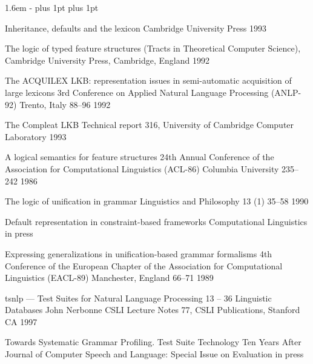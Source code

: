 \documentclass[12pt]{report}
\begin{document}
\begin{list}{}
   {\leftmargin 1.6em
    \itemindent -\leftmargin
    \itemsep 0pt plus 1pt
    \parsep 0pt plus 1pt}

{Inheritance, defaults and the lexicon}
{Cambridge University Press}
{1993}

{The logic of typed feature structures}
{(Tracts in Theoretical Computer Science), Cambridge University Press,
  Cambridge, England} 
{1992}


{The ACQUILEX LKB: representation issues in semi-automatic
acquisition of large lexicons}
{3rd Conference on Applied Natural Language Processing (ANLP-92)}
{Trento, Italy}
{88--96}
{1992}

{The Compleat LKB}
{Technical report 316,
University of Cambridge Computer Laboratory}
{1993}


{A logical semantics for feature structures}
{24th Annual Conference of the Association for Computational
Linguistics (ACL-86)}
{Columbia University}
{235--242}
{1986}

{The logic of unification in grammar}
{Linguistics and Philosophy}
{13 (1)}
{35--58}
{1990}

{Default representation in constraint-based frameworks}
{Computational Linguistics}
{in press}

  {Expressing generalizations in unification-based grammar formalisms}
  {4th Conference of the European Chapter of the Association 
for Computational Linguistics (EACL-89)}
  {Manchester, England}
  {66--71}
  {1989}

{{\sc tsnlp} --- {T}est {S}uites for {N}atural {L}anguage {P}rocessing}
{13 -- 36}
{Linguistic Databases}
{John Nerbonne}
{CSLI Lecture Notes 77, CSLI Publications, Stanford CA}
{1997}

{Towards Systematic Grammar Profiling.
               {T}est Suite Technology Ten Years After}
{Journal of Computer Speech and Language:
Special Issue on Evaluation}
{in press}



\end{list}
\end{document}
